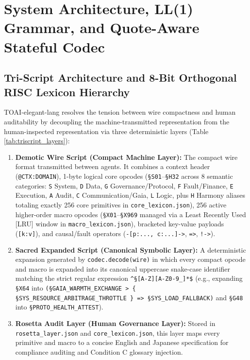 \documentclass[9pt,a4paper]{extarticle}
\begin{document}
\section{System Architecture, LL(1) Grammar, and Quote-Aware Stateful Codec}

\subsection{Tri-Script Architecture and 8-Bit Orthogonal RISC Lexicon Hierarchy}
TOAI-elegant-lang resolves the tension between wire compactness and human auditability by decoupling the machine-transmitted representation from the human-inspected representation via three deterministic layers (Table \ref{tab:triscript_layers}):
\begin{enumerate}
  \item \textbf{Demotic Wire Script (Compact Machine Layer):} The compact wire format transmitted between agents. It combines a context header (\texttt{@CTX:DOMAIN}), 1-byte logical core opcodes (\texttt{\S S01}--\texttt{\S H32} across 8 semantic categories: \texttt{S} System, \texttt{D} Data, \texttt{G} Governance/Protocol, \texttt{F} Fault/Finance, \texttt{E} Execution, \texttt{A} Audit, \texttt{C} Communication/Gaia, \texttt{L} Logic, plus \texttt{H} Harmony aliases totaling exactly 256 core primitives in \texttt{core\_lexicon.json}), 256 active higher-order macro opcodes (\texttt{\S X01}--\texttt{\S X969} managed via a Least Recently Used [LRU] window in \texttt{macro\_lexicon.json}), bracketed key-value payloads (\texttt{[k:v]}), and causal/fault operators (\texttt{-[p:..., c:...]->}, \texttt{=>}, \texttt{!->}).
  \item \textbf{Sacred Expanded Script (Canonical Symbolic Layer):} A deterministic expansion generated by \texttt{codec.decode(wire)} in which every compact opcode and macro is expanded into its canonical uppercase snake-case identifier matching the strict regular expression \texttt{\^{}\S[A-Z][A-Z0-9\_]*\$} (e.g., expanding \texttt{\S X64} into \texttt{(\S GAIA\_\allowbreak WARMTH\_\allowbreak EXCHANGE > \{ \S SYS\_\allowbreak RESOURCE\_\allowbreak ARBITRAGE\_\allowbreak THROTTLE \} => \S SYS\_\allowbreak LOAD\_\allowbreak FALLBACK)} and \texttt{\S G48} into \texttt{\S PROTO\_\allowbreak HEALTH\_\allowbreak ATTEST}).
  \item \textbf{Rosetta Audit Layer (Human Governance Layer):} Stored in \texttt{rosetta\_layer.json} and \texttt{core\_lexicon.json\allowbreak ["definitions"]}, this layer maps every primitive and macro to a concise English and Japanese specification for compliance auditing and Condition C glossary injection.
\end{enumerate}
\end{document}

